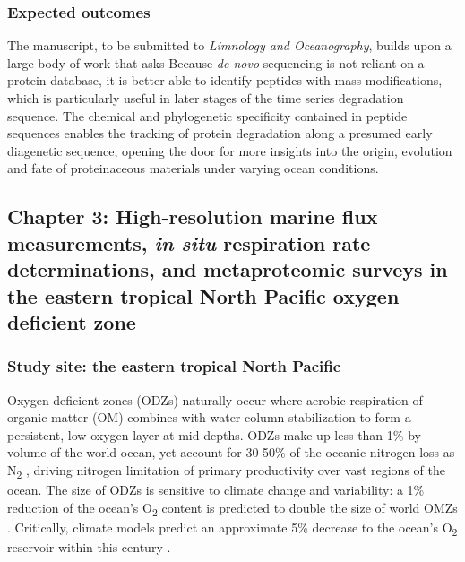 \documentclass[12pt, letterpaper, twoside]{article}
\begin{document}
\subsubsection*{Expected outcomes}

The manuscript, to be submitted to \textit{Limnology and Oceanography}, builds upon a large body of work that asks  Because \textit{de novo} sequencing is not reliant on a protein database, it is better able to identify peptides with mass modifications, which is particularly useful in later stages of the time series degradation sequence. The chemical and phylogenetic specificity contained in peptide sequences enables the tracking of protein degradation along a presumed early diagenetic sequence, opening the door for more insights into the origin, evolution and fate of proteinaceous materials under varying ocean conditions.

\subsection{Chapter 3: High-resolution marine flux measurements, \textit{in situ} respiration rate determinations, and metaproteomic surveys in the eastern tropical North Pacific oxygen deficient zone}

\subsubsection{Study site: the eastern tropical North Pacific}

Oxygen deficient zones (ODZs) naturally occur where aerobic respiration of organic matter (OM) combines with water column stabilization to form a persistent, low-oxygen layer at mid-depths. ODZs make up less than 1\% by volume of the world ocean, yet account for 30-50\% of the oceanic nitrogen loss as N\textsubscript{2} \cite{devries_marine_2013}, driving nitrogen limitation of primary productivity over vast regions of the ocean. The size of ODZs is sensitive to climate change and variability: a 1\% reduction of the ocean’s  O\textsubscript{2} content is predicted to double the size of world OMZs \cite{deutsch_climate-forced_2011}. Critically, climate models predict an approximate 5\% decrease to the ocean’s O\textsubscript{2} reservoir within this century \cite{bopp_multiple_2013}. 
\end{document}
